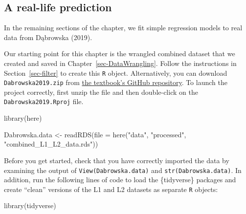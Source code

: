 \documentclass[
  letterpaper,
  DIV=11,
  numbers=noendperiod]{scrreprt}
\newenvironment{Shaded}{\begin{snugshade}}{\end{snugshade}}
\newcommand{\AttributeTok}[1]{\textcolor[rgb]{0.40,0.45,0.13}{#1}}
\newcommand{\FunctionTok}[1]{\textcolor[rgb]{0.28,0.35,0.67}{#1}}
\newcommand{\NormalTok}[1]{\textcolor[rgb]{0.00,0.23,0.31}{#1}}
\newcommand{\OtherTok}[1]{\textcolor[rgb]{0.00,0.23,0.31}{#1}}
\newcommand{\StringTok}[1]{\textcolor[rgb]{0.13,0.47,0.30}{#1}}
\begin{document}
\subsection{A real-life prediction}\label{a-real-life-prediction}

In the remaining sections of the chapter, we fit simple regression
models to real data from Dąbrowska (2019).

\begin{tcolorbox}[enhanced jigsaw, arc=.35mm, bottomrule=.15mm, bottomtitle=1mm, breakable, colback=white, colbacktitle=quarto-callout-warning-color!10!white, colframe=quarto-callout-warning-color-frame, coltitle=black, left=2mm, leftrule=.75mm, opacityback=0, opacitybacktitle=0.6, rightrule=.15mm, title=\textcolor{quarto-callout-warning-color}{\faExclamationTriangle}\hspace{0.5em}{Prerequisites}, titlerule=0mm, toprule=.15mm, toptitle=1mm]

Our starting point for this chapter is the wrangled combined dataset
that we created and saved in Chapter~\ref{sec-DataWrangling}. Follow the
instructions in Section~\ref{sec-filter} to create this \texttt{R}
object. Alternatively, you can download \texttt{Dabrowska2019.zip} from
\href{https://github.com/elenlefoll/RstatsTextbook/raw/69d1e31be7394f2b612825f031ebffeb75886390/Dabrowska2019.zip}{the
textbook's GitHub repository}. To launch the project correctly, first
unzip the file and then double-click on the \texttt{Dabrowska2019.Rproj}
file.

\begin{Shaded}
\begin{Highlighting}[]
\FunctionTok{library}\NormalTok{(here)}

\NormalTok{Dabrowska.data }\OtherTok{\textless{}{-}} \FunctionTok{readRDS}\NormalTok{(}\AttributeTok{file =} \FunctionTok{here}\NormalTok{(}\StringTok{"data"}\NormalTok{, }\StringTok{"processed"}\NormalTok{, }\StringTok{"combined\_L1\_L2\_data.rds"}\NormalTok{))}
\end{Highlighting}
\end{Shaded}

Before you get started, check that you have correctly imported the data
by examining the output of \texttt{View(Dabrowska.data)} and
\texttt{str(Dabrowska.data)}. In addition, run the following lines of
code to load the \{tidyverse\} packages and create ``clean'' versions of
the L1 and L2 datasets as separate \texttt{R} objects:

\begin{Shaded}
\begin{Highlighting}[]
\FunctionTok{library}\NormalTok{(tidyverse)}


\end{Highlighting}
\end{Shaded}
\end{tcolorbox}
\end{document}

